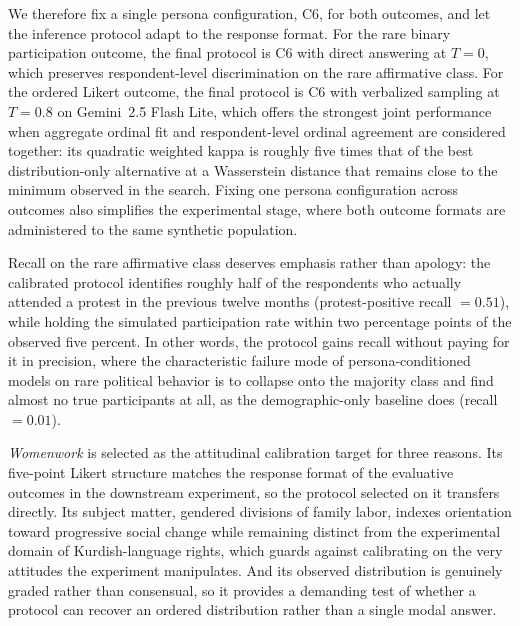 
We therefore fix a single persona configuration, C6, for both outcomes, and
let the inference protocol adapt to the response format. For the rare binary
participation outcome, the final protocol is C6 with direct answering at
$T=0$, which preserves respondent-level discrimination on the rare
affirmative class. For the ordered Likert outcome, the final protocol is C6
with verbalized sampling at $T=0.8$ on Gemini~2.5 Flash Lite, which offers
the strongest joint performance when aggregate ordinal fit and
respondent-level ordinal agreement are considered together: its quadratic
weighted kappa is roughly five times that of the best distribution-only
alternative at a Wasserstein distance that remains close to the minimum
observed in the search. Fixing one persona configuration across outcomes
also simplifies the experimental stage, where both outcome formats are
administered to the same synthetic population.


Recall on the rare affirmative class deserves emphasis rather than apology:
the calibrated protocol identifies roughly half of the respondents who
actually attended a protest in the previous twelve months
(protest-positive recall $= 0.51$), while holding the simulated participation
rate within two percentage points of the observed five percent. In other
words, the protocol gains recall without paying for it in precision, where
the characteristic failure mode of persona-conditioned models on rare
political behavior is to collapse onto the majority class and find almost no
true participants at all, as the demographic-only baseline does
(recall $= 0.01$).


\emph{Womenwork} is selected as the attitudinal calibration target for three
reasons. Its five-point Likert structure matches the response format of the
evaluative outcomes in the downstream experiment, so the protocol selected
on it transfers directly. Its subject matter, gendered divisions of family
labor, indexes orientation toward progressive social change while remaining
distinct from the experimental domain of Kurdish-language rights, which
guards against calibrating on the very attitudes the experiment
manipulates. And its observed distribution is genuinely graded rather than
consensual, so it provides a demanding test of whether a protocol can
recover an ordered distribution rather than a single modal answer.

